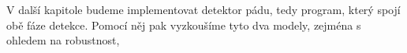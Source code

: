 V další kapitole budeme implementovat detektor pádu, tedy program, který spojí
obě fáze detekce. Pomocí něj pak vyzkoušíme tyto dva modely, zejména s ohledem
na robustnost,
%
%
%
%
%
%
%
%
%
%
%
%
%
%
%
%



